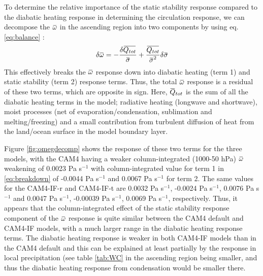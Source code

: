 \documentclass[letterpaper,12pt,titlepage,oneside,final]{book}
\newcommand{\overbar}[1]{\mkern 1.5mu\overline{\mkern-1.5mu#1\mkern-1.5mu}\mkern 1.5mu}
\begin{document}
To determine the relative importance of the static stability response compared to the diabatic heating response in determining the circulation response, we can decompose the $\overbar{\omega}$ in the ascending region into two components by using eq. \ref{eq:balance} \citep{yanai_determination_1973,li_strengthening_2015}:
\begin{align}\label{eq:breakdown}
\delta{\overbar{\omega}}=-\frac{\delta{\overbar{Q_{tot}}}}{\overbar{\sigma}}+\frac{\overbar{Q_{tot}}}{{\overbar{\sigma}}^{2}}\delta{\overbar{\sigma}}
\end{align}
This effectively breaks the $\overbar{\omega}$ response down into diabatic heating (term 1) and static stability (term 2) response terms. Thus, the total $\overbar{\omega}$ response is a residual of these two terms, which are opposite in sign. Here, $\overbar{Q}_{tot}$ is the sum of all the diabatic heating terms in the model; radiative heating (longwave and shortwave), moist processes (net of evaporation/condensation, sublimation and melting/freezing) and a small contribution from turbulent diffusion of heat from the land/ocean surface in the model boundary layer.  


Figure \ref{fig:omegdecomp} shows the response of these two terms for the three models, with the CAM4 having a weaker column-integrated (1000-50 hPa) $\overbar{\omega}$ weakening of 0.0023 Pa s$^{-1}$ with column-integrated value for term 1 in \ref{eq:breakdown} of -0.0044 Pa s$^{-1}$ and 0.0067 Pa s$^{-1}$ for term 2. The same values for the CAM4-IF-r and CAM4-IF-t are 0.0032 Pa s$^{-1}$, -0.0024 Pa s$^{-1}$, 0.0076 Pa s$^{-1}$ and 0.0047 Pa s$^{-1}$, -0.00039 Pa s$^{-1}$, 0.0069 Pa s$^{-1}$, respectively. Thus, it appears that the column-integrated effect of the static stability response component of the $\overbar{\omega}$ response is quite similar between the CAM4 default and CAM4-IF models, with a much larger range in the diabatic heating response terms. The diabatic heating response is weaker in both CAM4-IF models than in the CAM4 default and this can be explained at least partially by the response in local precipitation (see table \ref{tab:WC} in the ascending region being smaller, and thus the diabatic heating response from condensation would be smaller there.
\end{document}
